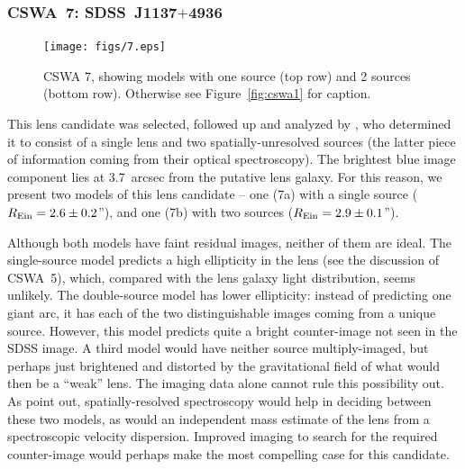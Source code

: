 \documentclass[iop]{emulateapj}
\def\Rein{R_{\rm Ein}}
\begin{document}

\subsubsection*{CSWA~7: SDSS\ J1137$+$4936}
\label{sec:results:indinotes:cswa7}


\begin{figure}[!ht]
	\centering\texttt{[image: figs/7.eps]}
	\caption{CSWA 7, showing models with one source (top row) and 2 sources
      (bottom row). Otherwise see Figure~\ref{fig:cswa1} for caption.}
	\label{fig:cswa7}
\end{figure}

This lens candidate  was selected, followed up and analyzed by \citet{Kub++09},
who determined it to consist of a single lens and  two spatially-unresolved
sources (the latter piece of information coming from their optical
spectroscopy). The brightest blue image component  lies at 3.7~arcsec from the
putative lens galaxy. For this reason, we present two models of this lens
candidate -- one (7a)  with a single source ($\Rein = 2.6\pm0.2$''), and one
(7b) with two sources  ($\Rein = 2.9\pm0.1$''). 


Although both models have faint residual images, neither of them are ideal. The
single-source model predicts a high ellipticity in the lens (see the discussion
of CSWA~5), which, compared with the lens galaxy light distribution, seems
unlikely.  The double-source model has lower ellipticity: instead of predicting
one giant arc, it has each of the two distinguishable images coming from a
unique source. However, this model predicts quite a bright counter-image not 
seen in the SDSS image. A third model would have neither source multiply-imaged,
but perhaps just brightened and distorted by the gravitational field of what
would then be a ``weak'' lens. The imaging  data alone cannot rule this
possibility out. As \citet{Kub++09} point out, spatially-resolved spectroscopy
would help in deciding between these two models, as would an  independent mass
estimate of the lens from a spectroscopic velocity dispersion. Improved imaging
to search for the required counter-image would perhaps make the most compelling
case for this candidate. 


\end{document}
